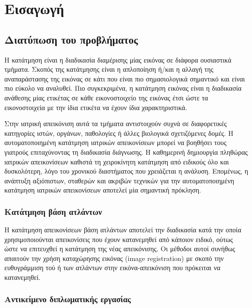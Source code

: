 \documentclass[a4paper,12pt]{article}
\begin{document}
\tableofcontents

\listoffigures

\listoftables

\section{Εισαγωγή}

\subsection{Διατύπωση του προβλήματος}

Η κατάτμηση είναι η διαδικασία διαμέρισης μίας εικόνας σε διάφορα ουσιαστικά
τμήματα. Σκοπός της κατάτμησης είναι η απλοποίηση ή/και η αλλαγή της
αναπαράστασης της εικόνας σε κάτι που είναι πιο σημασιολογικά σημαντικό και
είναι πιο εύκολο να αναλυθεί. Πιο συγκεκριμένα, η κατάτμηση εικόνας είναι η
διαδικασία ανάθεσης μίας ετικέτας σε κάθε εικονοστοιχείο της εικόνας έτσι ώστε
τα εικονοστοιχεία με την ίδια ετικέτα να έχουν ίδια χαρακτηριστικά.

Στην ιατρική απεικόνιση αυτά τα τμήματα αντιστοιχούν συχνά σε διαφορετικές
κατηγορίες ιστών, οργάνων, παθολογίες ή άλλες βιολογικά σχετιζόμενες δομές. Η
αυτοματοποιημένη κατάτμηση ιατρικών απεικονίσεων μπορεί να βοηθήσει τους
γιατρούς επιταχύνοντας τη διαδικασία διάγνωσης. Η καθημερινή δημιουργία πληθώρας
ιατρικών απεικονίσεων καθιστά τη χειροκίνητη κατάτμηση από ειδικούς όλο και
δυσκολότερη, λόγο του χρονικού διαστήματος που χρειάζεται η ανάλυση. Επομένως, η
ανάπτυξη αξιόπιστων, σταθερών και ακριβών τεχνικών για την αυτοματοποιημένη
κατάτμηση ιατρικών απεικονίσεων αποτελεί μία σημαντική πρόκληση.

\subsubsection{Κατάτμηση βάση ατλάντων}

Η κατάτμηση απεικονίσεων βάση ατλάντων αποτελεί την διαδικασία κατά την οποία
χρησιμοποιούνται απεικονίσεις που έχουν κατανεμηθεί από κάποιον ειδικό, ούτως
ώστε να επιτευχθεί η κατάτμηση της νέας απεικόνισης. Οι μέθοδοι αυτοί συνήθως
απαιτούν την χρήση καταχώρησης εικόνας (image registration) με σκοπό την
ευθυγράμμιση τού ή των ατλάντων στην εικόνα-απεικόνιση που πρόκειται να
κατανεμηθεί.

\subsubsection{Αντικείμενο διπλωματικής εργασίας}
\end{document}
